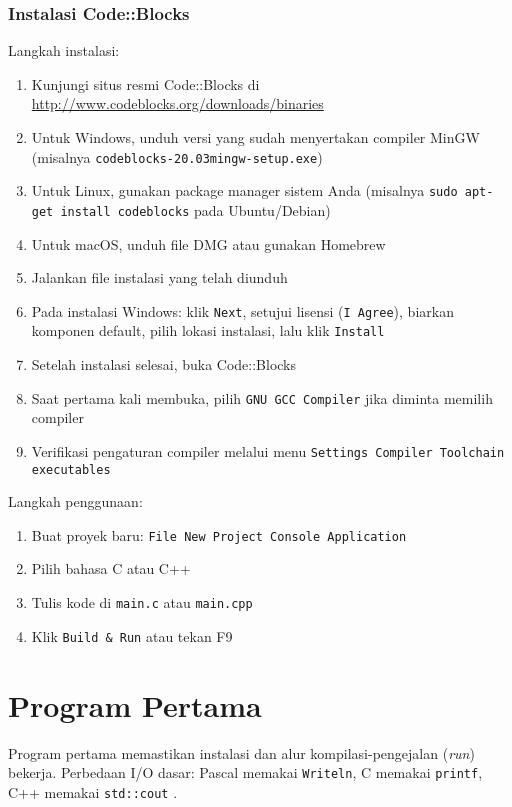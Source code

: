 \documentclass[../main.tex]{subfiles}
\begin{document}
\subsubsection{Instalasi Code::Blocks}
Langkah instalasi:
\begin{enumerate}
  \item Kunjungi situs resmi Code::Blocks di \url{http://www.codeblocks.org/downloads/binaries}
  \item Untuk Windows, unduh versi yang sudah menyertakan compiler MinGW (misalnya \texttt{codeblocks-20.03mingw-setup.exe})
  \item Untuk Linux, gunakan package manager sistem Anda (misalnya \texttt{sudo apt-get install codeblocks} pada Ubuntu/Debian)
  \item Untuk macOS, unduh file DMG atau gunakan Homebrew
  \item Jalankan file instalasi yang telah diunduh
  \item Pada instalasi Windows: klik \texttt{Next}, setujui lisensi (\texttt{I Agree}), biarkan komponen default, pilih lokasi instalasi, lalu klik \texttt{Install}
  \item Setelah instalasi selesai, buka Code::Blocks
  \item Saat pertama kali membuka, pilih \texttt{GNU GCC Compiler} jika diminta memilih compiler
  \item Verifikasi pengaturan compiler melalui menu \texttt{Settings \textrightarrow{} Compiler \textrightarrow{} Toolchain executables}
\end{enumerate}

Langkah penggunaan:
\begin{enumerate}
  \item Buat proyek baru: \texttt{File \textrightarrow{} New \textrightarrow{} Project \textrightarrow{} Console Application}
  \item Pilih bahasa C atau C++
  \item Tulis kode di \texttt{main.c} atau \texttt{main.cpp}
  \item Klik \texttt{Build \& Run} atau tekan F9
\end{enumerate}

\section{Program Pertama}
Program pertama memastikan instalasi dan alur kompilasi-pengejalan (\emph{run}) bekerja. Perbedaan I/O dasar: Pascal memakai \texttt{Writeln}, C memakai \texttt{printf}, C++ memakai \texttt{std::cout} \parencite{w3pascal-io,gnu-c-manual,cpp-reference}.
\end{document}
